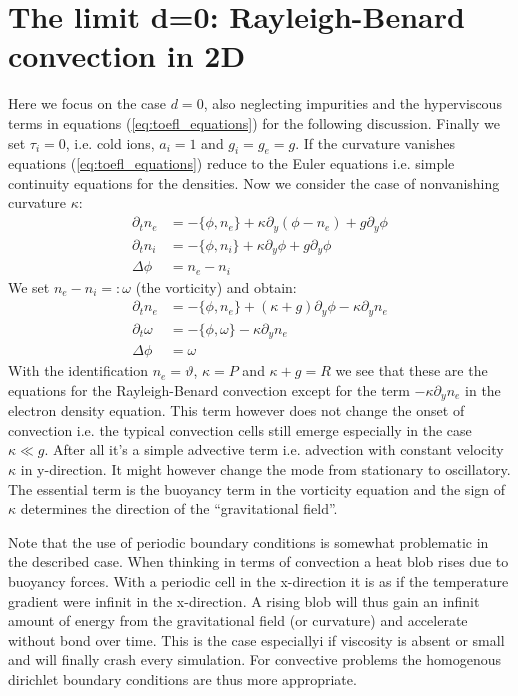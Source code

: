 \documentclass[a4paper,12pt]{scrartcl}
\begin{document}
\section{ The limit d=0: Rayleigh-Benard convection in 2D}
\label{sec:rayleigh-benard}
Here we focus on the case $d=0$, also neglecting impurities and the hyperviscous 
terms in equations (\ref{eq:toefl_equations}) for the following discussion. 
Finally we set $\tau_i=0$, i.e. cold ions, $a_i=1$ and $g_i=g_e=g$.
If the curvature vanishes equations (\ref{eq:toefl_equations}) reduce to the Euler 
equations i.e. simple continuity equations for the densities. 
Now we consider the case of nonvanishing curvature $\kappa$:
\begin{subequations}
\begin{align}
    \partial_t n_e &= -\{\phi,n_e\} +\kappa\partial_y(\phi - n_e)  + g\partial_y\phi \\
    \partial_t n_i &= -\{\phi,n_i\} +\kappa\partial_y\phi  + g\partial_y\phi \\
    \Delta\phi &= n_e - n_i
\end{align}
\label{eq:toefl_pre_rb}
\end{subequations}
We set $n_e - n_i =: \omega$ (the vorticity) and obtain:
\begin{subequations}
\begin{align}
    \partial_t n_e &= -\{\phi,n_e\} +(\kappa+g)\partial_y\phi - \kappa\partial_y n_e \\
    \partial_t \omega &=-\{\phi, \omega\} -\kappa \partial_y n_e \\
    \Delta\phi &= \omega 
\end{align}
\label{eq:toefl_rb}
\end{subequations}
With the identification $n_e = \vartheta$, $\kappa = P$ and $\kappa+g=R$ we see that these are
the equations for the Rayleigh-Benard convection except for the term 
$-\kappa\partial_y n_e$
in the electron density equation. 
This term however does not change the onset of convection i.e. the 
typical convection cells still emerge especially in the case $\kappa \ll g$. 
After all it's a simple advective term 
i.e. advection with constant velocity $\kappa$ in y-direction. It might
however change the mode from stationary to oscillatory. 
The essential term is the buoyancy term in the vorticity equation and the
sign of $\kappa$ determines the direction of the ``gravitational field''. 

Note that the use of periodic boundary conditions is somewhat problematic in 
the described case. When thinking in terms of convection a heat blob rises due to
buoyancy forces. With a periodic cell in the x-direction it is as if the 
temperature gradient were infinit in the x-direction. A rising blob will thus
gain an infinit amount of energy from the gravitational field (or curvature)
and accelerate without bond over time. 
This is the case especiallyi if viscosity is absent or small and will finally 
crash every simulation.
For convective problems the homogenous dirichlet boundary conditions are thus more 
appropriate.







\end{document}
